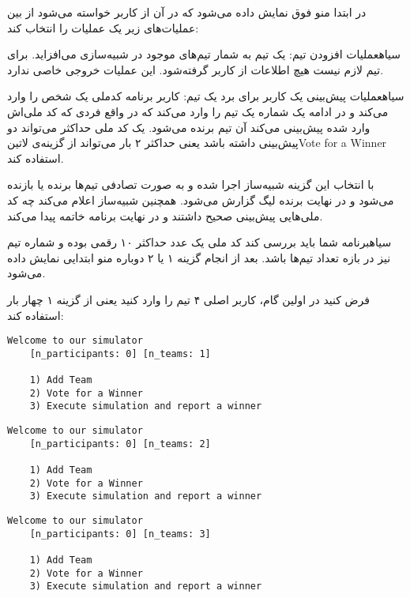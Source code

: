 \documentclass[../main.tex]{subfiles}
\begin{document}
در ابتدا منو فوق نمایش داده می‌شود
که در آن از کاربر خواسته می‌شود از بین عملیات‌های زیر یک عملیات را انتخاب کند:

 ‌سیاه{عملیات افزودن تیم}: یک تیم به شمار تیم‌های موجود در شبیه‌سازی می‌افزاید.
    برای تیم لازم نیست هیچ اطلاعات از کاربر گرفته‌شود. این عملیات خروجی خاصی ندارد.

 ‌سیاه{عملیات پیش‌بینی یک کاربر برای برد یک تیم}:
    کاربر برنامه کدملی یک شخص را وارد می‌کند و در ادامه یک شماره یک تیم را وارد می‌کند
    که در واقع فردی که کد ملی‌اش وارد شده پیش‌بینی می‌کند آن تیم برنده می‌شود.
    یک کد ملی حداکثر می‌تواند دو پیش‌بینی داشته باشد
    یعنی حداکثر ۲ بار می‌تواند از گزینه‌ی
    ‌لاتین{Vote for a Winner}
    استفاده کند.

 با انتخاب این گزینه شبیه‌ساز اجرا شده و به صورت تصادفی تیم‌ها برنده یا بازنده می‌شود
    و در نهایت برنده لیگ گزارش می‌شود.
    همچنین شبیه‌ساز اعلام می‌کند چه کد ملی‌هایی پیش‌بینی صحیح داشتند و در نهایت برنامه خاتمه پیدا می‌کند.

‌سیاه{برنامه شما باید بررسی کند کد ملی یک عدد حداکثر ۱۰ رقمی بوده و شماره تیم نیز در بازه تعداد تیم‌ها باشد}.
بعد از انجام گزینه ۱ یا ۲ دوباره منو ابتدایی نمایش داده می‌شود.


فرض کنید در اولین گام، کاربر اصلی ۴ تیم را وارد کنید یعنی از گزینه ۱ چهار بار استفاده کند:

\begin{latin}
\begin{lstlisting}[]
    Welcome to our simulator
    [n_participants: 0] [n_teams: 1]

    1) Add Team
    2) Vote for a Winner
    3) Execute simulation and report a winner
\end{lstlisting}
\end{latin}


\begin{latin}
\begin{lstlisting}[]
    Welcome to our simulator
    [n_participants: 0] [n_teams: 2]

    1) Add Team
    2) Vote for a Winner
    3) Execute simulation and report a winner
\end{lstlisting}
\end{latin}

\begin{latin}
\begin{lstlisting}[]
    Welcome to our simulator
    [n_participants: 0] [n_teams: 3]

    1) Add Team
    2) Vote for a Winner
    3) Execute simulation and report a winner
\end{lstlisting}
\end{latin}
\end{document}
